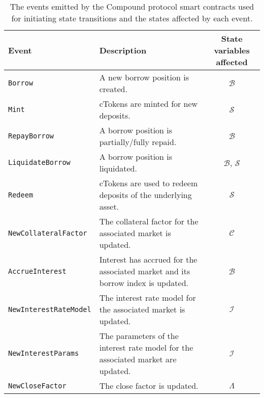 
\begin{table}[tb]
	\centering
	\caption[Events emitted by the Compound protocol]{The events emitted by the Compound protocol smart contracts used for initiating state transitions and the states affected by each event.}
	\label{tab:compound-events}
	\small
	\setlength{\tabcolsep}{1.5pt}
	\begin{tabular}{lp{6cm}c}
		\toprule
		{\bf Event}                   & {\bf Description}                                                                &
		{\bf State variables affected}                                                                                                                  \\

		\midrule
		\texttt{Borrow}               & A new borrow position is created.                                                & $\mathcal{B}$                \\
		\texttt{Mint}                 & cTokens are minted for new deposits.                                             & $\mathcal{S}$                \\
		\texttt{RepayBorrow}          & A borrow position is partially/fully repaid.                                     & $\mathcal{B}$                \\
		\texttt{LiquidateBorrow}      & A borrow position is liquidated.                                                 & $\mathcal{B}$, $\mathcal{S}$ \\
		\texttt{Redeem}               & cTokens are used to redeem deposits of the underlying asset.                     & $\mathcal{S}$                \\
		\texttt{NewCollateralFactor}  & The collateral factor for the associated market is updated.                      & $\mathcal{C}$                \\
		\texttt{AccrueInterest}       & Interest has accrued for the associated market and its borrow index is updated.  & $\mathcal{B}$                \\
		\texttt{NewInterestRateModel} & The interest rate model for the associated market is updated.                    & $\mathcal{I}$                \\
		\texttt{NewInterestParams}    & The parameters of the interest rate model for the associated market are updated. & $\mathcal{I}$                \\
		\texttt{NewCloseFactor}       & The close factor is updated.                                                     & $\Lambda$                    \\
		\bottomrule
	\end{tabular}
\end{table}

